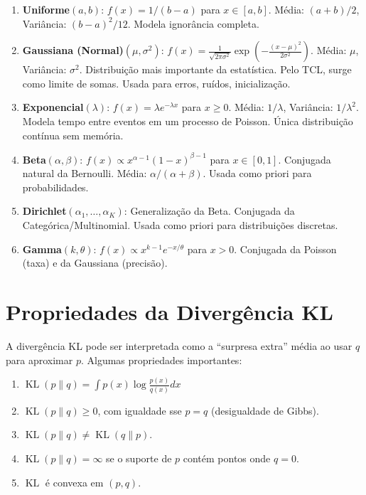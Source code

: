 \documentclass{tufte-handout}
\DeclareMathOperator{\KL}{KL}
\begin{document}
\begin{enumerate}
    \item \textbf{Uniforme}$(a, b)$: $f(x) = 1/(b-a)$ para $x \in [a, b]$.
    Média: $(a+b)/2$, Variância: $(b-a)^2/12$. Modela ignorância completa.

    \item \textbf{Gaussiana (Normal)}$(\mu, \sigma^2)$:
    $f(x) = \frac{1}{\sqrt{2\pi\sigma^2}} \exp\left(-\frac{(x-\mu)^2}{2\sigma^2}\right)$.
    Média: $\mu$, Variância: $\sigma^2$. Distribuição mais importante da estatística.
    Pelo TCL, surge como limite de somas. Usada para erros, ruídos, inicialização.

    \item \textbf{Exponencial}$(\lambda)$: $f(x) = \lambda e^{-\lambda x}$ para $x \ge 0$.
    Média: $1/\lambda$, Variância: $1/\lambda^2$. Modela tempo entre eventos em um
    processo de Poisson. Única distribuição contínua sem memória.

    \item \textbf{Beta}$(\alpha, \beta)$: $f(x) \propto x^{\alpha-1}(1-x)^{\beta-1}$ para
    $x \in [0, 1]$. Conjugada natural da Bernoulli. Média: $\alpha/(\alpha+\beta)$.
    Usada como priori para probabilidades.

    \item \textbf{Dirichlet}$(\alpha_1, \dots, \alpha_K)$: Generalização da Beta.
    Conjugada da Categórica/Multinomial. Usada como priori para distribuições discretas.

    \item \textbf{Gamma}$(k, \theta)$: $f(x) \propto x^{k-1} e^{-x/\theta}$ para $x > 0$.
    Conjugada da Poisson (taxa) e da Gaussiana (precisão).
\end{enumerate}

\section{Propriedades da Divergência KL}

A divergência KL pode ser interpretada como a ``surpresa extra'' média ao usar $q$
para aproximar $p$. Algumas propriedades importantes:

\begin{enumerate}
    \item $\KL(p \parallel q) = \int p(x) \log \frac{p(x)}{q(x)} dx$
    \item $\KL(p \parallel q) \ge 0$, com igualdade sse $p = q$ (desigualdade de Gibbs).
    \item $\KL(p \parallel q) \neq \KL(q \parallel p)$.
    \item $\KL(p \parallel q) = \infty$ se o suporte de $p$ contém pontos onde $q = 0$.
    \item $\KL$ é convexa em $(p, q)$.
\end{enumerate}
\end{document}
